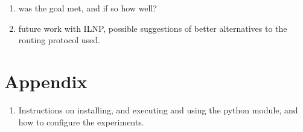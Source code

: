 \documentclass[12pt]{article}
\begin{document}
\begin{enumerate}	
\item was the goal met, and if so how well?
\item future work with ILNP, possible suggestions of better alternatives to the routing protocol used.
\end{enumerate}

\section{Appendix}
\begin{enumerate}
\item Instructions on installing, and executing and using the python module, and how to configure the experiments.
\end{enumerate}



\end{document}
